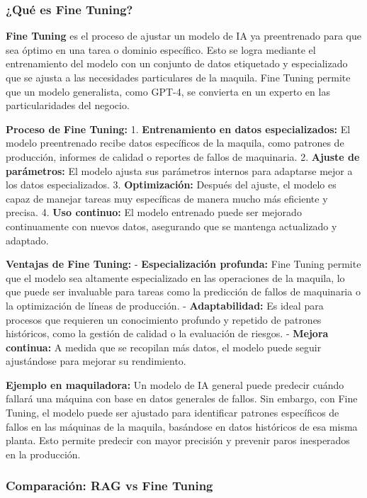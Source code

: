 \documentclass[
  10pt,
  letterpaper,
]{book}
\begin{document}
\subsubsection{\texorpdfstring{\textbf{¿Qué es Fine
Tuning?}}{¿Qué es Fine Tuning?}}\label{quuxe9-es-fine-tuning}

\textbf{Fine Tuning} es el proceso de ajustar un modelo de IA ya
preentrenado para que sea óptimo en una tarea o dominio específico. Esto
se logra mediante el entrenamiento del modelo con un conjunto de datos
etiquetado y especializado que se ajusta a las necesidades particulares
de la maquila. Fine Tuning permite que un modelo generalista, como
GPT-4, se convierta en un experto en las particularidades del negocio.

\textbf{Proceso de Fine Tuning:} 1. \textbf{Entrenamiento en datos
especializados:} El modelo preentrenado recibe datos específicos de la
maquila, como patrones de producción, informes de calidad o reportes de
fallos de maquinaria. 2. \textbf{Ajuste de parámetros:} El modelo ajusta
sus parámetros internos para adaptarse mejor a los datos especializados.
3. \textbf{Optimización:} Después del ajuste, el modelo es capaz de
manejar tareas muy específicas de manera mucho más eficiente y precisa.
4. \textbf{Uso continuo:} El modelo entrenado puede ser mejorado
continuamente con nuevos datos, asegurando que se mantenga actualizado y
adaptado.

\textbf{Ventajas de Fine Tuning:} - \textbf{Especialización profunda:}
Fine Tuning permite que el modelo sea altamente especializado en las
operaciones de la maquila, lo que puede ser invaluable para tareas como
la predicción de fallos de maquinaria o la optimización de líneas de
producción. - \textbf{Adaptabilidad:} Es ideal para procesos que
requieren un conocimiento profundo y repetido de patrones históricos,
como la gestión de calidad o la evaluación de riesgos. - \textbf{Mejora
continua:} A medida que se recopilan más datos, el modelo puede seguir
ajustándose para mejorar su rendimiento.

\textbf{Ejemplo en maquiladora:} Un modelo de IA general puede predecir
cuándo fallará una máquina con base en datos generales de fallos. Sin
embargo, con Fine Tuning, el modelo puede ser ajustado para identificar
patrones específicos de fallos en las máquinas de la maquila, basándose
en datos históricos de esa misma planta. Esto permite predecir con mayor
precisión y prevenir paros inesperados en la producción.

\subsubsection{\texorpdfstring{\textbf{Comparación: RAG vs Fine
Tuning}}{Comparación: RAG vs Fine Tuning}}\label{comparaciuxf3n-rag-vs-fine-tuning}
\end{document}
